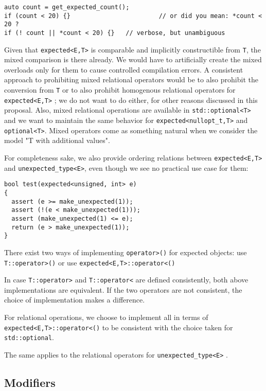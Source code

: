 \documentclass[a4paper,10pt]{article}
\newcommand{\cpp}[1]{\lstinline{#1}}
\begin{document}
\begin{lstlisting}
auto count = get_expected_count();
if (count < 20) {}                        // or did you mean: *count < 20 ?
if (! count || *count < 20) {}   // verbose, but unambiguous
\end{lstlisting}

Given that \cpp{expected<E,T>} is comparable and implicitly constructible from \cpp{T}, the mixed comparison is there already. We would have to artificially create the mixed overloads only for them to cause controlled compilation errors. A consistent approach to prohibiting mixed relational operators would be to also prohibit the conversion from \cpp{T} or to also prohibit homogenous relational operators for \cpp{expected<E,T>} ; we do not want to do either, for other reasons discussed in this proposal. Also, mixed relational operations are available in \cpp{std::optional<T>} and we want to maintain the same behavior for \cpp{expected<nullopt_t,T>} and \cpp{optional<T>}. Mixed operators come as something natural when we consider the model "T with additional values".

For completeness sake, we also provide ordering relations between  \cpp{expected<E,T>} and  \cpp{unexpected_type<E>}, even though we see no practical use case for them:

\begin{lstlisting}
bool test(expected<unsigned, int> e)
{
  assert (e >= make_unexpected(1));    
  assert (!(e < make_unexpected(1)));  
  assert (make_unexpected(1) <= e);    
  return (e > make_unexpected(1));     
}
\end{lstlisting}

There exist two ways of implementing \cpp{operator>()} for expected objects: use \cpp{T::operator>()} or use \cpp{expected<E,T>::operator<()}

In case \cpp{T::operator>} and \cpp{T::operator<} are defined consistently, both above implementations are equivalent. If the two operators are not consistent, the choice of implementation makes a difference. 

For relational operations, we choose to implement all in terms of  \cpp{expected<E,T>::operator<()} to be consistent with the choice taken for \cpp{std::optional}.

The same applies to the relational operators for \cpp{unexpected_type<E>} .

\subsection{Modifiers}
\end{document}
